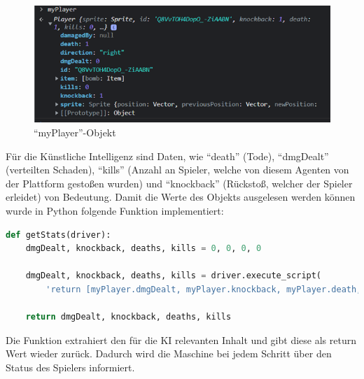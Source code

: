 \begin{figure}[H]
  \centering
  \includegraphics[scale=0.65]{pics/ai/myPlayer.png}
  \caption{``myPlayer''-Objekt}
  \label{fig:ai:myPlayerPic}
\end{figure}

Für die Künstliche Intelligenz sind Daten, wie ``death'' (Tode), ``dmgDealt'' (verteilten Schaden), ``kills'' (Anzahl an Spieler, welche von diesem Agenten von der Plattform gestoßen wurden) und ``knockback'' (Rückstoß, welcher der Spieler erleidet) von Bedeutung.
Damit die Werte des Objekts ausgelesen werden können wurde in Python folgende Funktion implementiert:

\begin{lstlisting}[language=Python,label=lst:maap:getstats,caption=Informationen über den Spieler]
def getStats(driver):
    dmgDealt, knockback, deaths, kills = 0, 0, 0, 0

    dmgDealt, knockback, deaths, kills = driver.execute_script(
        'return [myPlayer.dmgDealt, myPlayer.knockback, myPlayer.death, myPlayer.kills]')

    return dmgDealt, knockback, deaths, kills
\end{lstlisting}

Die Funktion extrahiert den für die KI relevanten Inhalt und gibt diese als return Wert wieder zurück. Dadurch wird die Maschine bei jedem Schritt über den Status des Spielers informiert.

